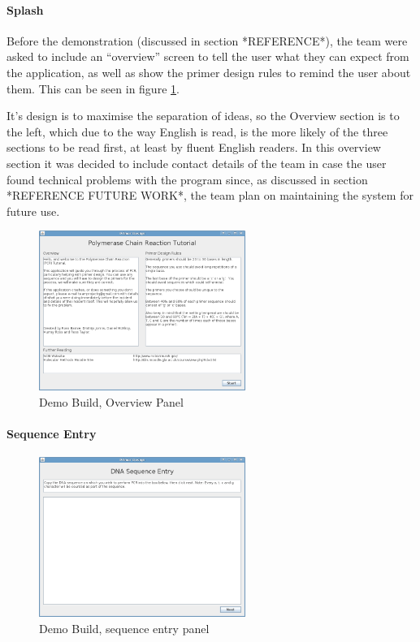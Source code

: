 \paragraph{Splash}

Before the demonstration (discussed in section *REFERENCE*), the team
were asked to include an ``overview'' screen to tell the user what
they can expect from the application, as well as show the primer
design rules to remind the user about them.
This can be seen in figure \ref{fig:demoBuild:splash}.

It's design is to maximise the separation of ideas, so the Overview
section is to the left, which due to the way English is read, is the
more likely of the three sections to be read first, at least by fluent
English readers.
In this overview section it was decided to include contact details
of the team in case the user found technical problems with the
program since, as discussed in section *REFERENCE FUTURE WORK*, the
team plan on maintaining the system for future use.

\begin{figure}[h]
  \begin{center}
    \includegraphics[width=0.6\textwidth]{./images/demoBuild/splash.png}
    \caption{
      \label{fig:demoBuild:splash}
      Demo Build, Overview Panel 
    }
  \end{center}
\end{figure}

\paragraph{Sequence Entry}

\begin{figure}[h]
  \begin{center}
    \includegraphics[width=0.6\textwidth]{./images/demoBuild/sequenceEntry.png}
    \caption{
      \label{fig:demoBuild:sequenceEntry}
      Demo Build, sequence entry panel 
    }
  \end{center}
\end{figure}

